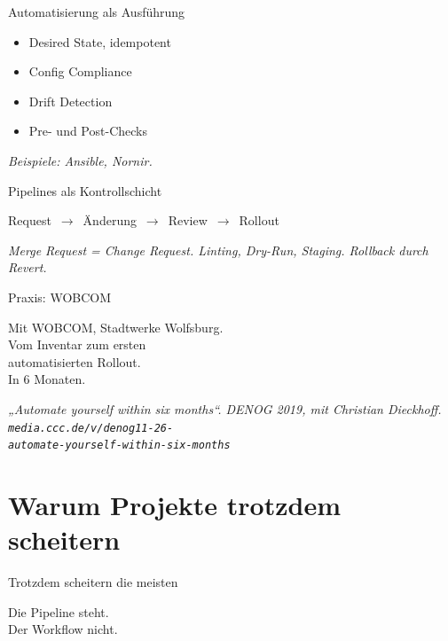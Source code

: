 \documentclass[aspectratio=1610,14pt]{beamer}
\newcommand{\hero}[1]{%
  \vfill
  \begin{center}
    {\sffamily #1\par}
  \end{center}
  \vfill
}
\begin{document}
  \begin{frame}{Automatisierung als Ausführung}
    \begin{itemize}
      \item Desired State, idempotent
      \item Config Compliance
      \item Drift Detection
      \item Pre- und Post-Checks
    \end{itemize}
    \vspace{1em}
    {\color{mute}\itshape Beispiele: Ansible, Nornir.}
  \end{frame}

  \begin{frame}{Pipelines als Kontrollschicht}
    \vfill
    \begin{center}
      Request \,{\color{copper}$\to$}\, Änderung \,{\color{copper}$\to$}\, Review \,{\color{copper}$\to$}\, Rollout
    \end{center}
    \vfill
    {\color{mute}\itshape Merge Request = Change Request. Linting, Dry-Run, Staging. Rollback durch Revert.}
  \end{frame}

  \begin{frame}{Praxis: WOBCOM}
    \vfill
    \begin{center}
      Mit WOBCOM, Stadtwerke Wolfsburg.\\[0.6em]
      Vom Inventar zum ersten\\
      automatisierten Rollout.\\[0.6em]
      In 6 Monaten.
    \end{center}
    \vfill
    {\color{mute}\itshape „Automate yourself within six months“. DENOG 2019, mit Christian Dieckhoff.\\
    \texttt{media.ccc.de/v/denog11-26-}\\
    \texttt{automate-yourself-within-six-months}}
  \end{frame}

  \section{Warum Projekte trotzdem scheitern}
  \begin{frame}{Trotzdem scheitern die meisten}
    \hero{Die Pipeline steht.\\
    Der Workflow nicht.}
  \end{frame}
\end{document}
